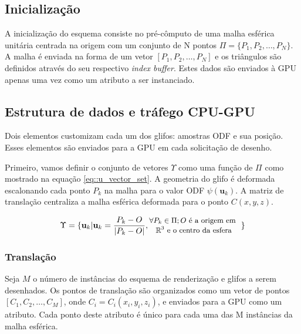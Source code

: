 \documentclass[
    12pt,                %
    oneside,            %
    a4paper,            %
    english,            %
    french,                %
    spanish,            %
    brazil                %
    ]{abntex2}
\begin{document}
\subsection{Inicialização}
\label{ssec::initializacao_glifo}

A inicialização do esquema consiste no pré-cômputo de uma malha esférica unitária centrada na origem com um conjunto de N pontos $\Pi = \{P_1, P_2, \dots, P_N\}$. A malha é enviada na forma de um vetor $[P_1, P_2, \dots, P_N]$ e os triângulos são definidos através do seu respectivo \textit{index buffer}. Estes dados são enviados à GPU apenas uma vez como um atributo a ser instanciado.

\subsection{Estrutura de dados e tráfego CPU-GPU}
\label{ssec::datastruct}

Dois elementos customizam cada um dos glifos: amostras ODF e sua posição. Esses elementos são enviados para a GPU em cada solicitação de desenho.

Primeiro, vamos definir o conjunto de vetores $\Upsilon$ como uma função de $\Pi$ como mostrado na equação \ref{eq::u_vector_set}. A geometria do glifo é deformada escalonando cada ponto $P_k$ na malha para o valor ODF $\psi(\mathbf{u}_k)$. A matriz de translação centraliza a malha esférica deformada para o ponto $C(x, y, z)$.

\begin{equation}
\label{eq::u_vector_set}
\Upsilon = \{\mathbf{u}_k | \mathbf{u}_k = \frac{P_k - O}{|P_k - O|}, 
\begin{tabular}{@{}c@{}}
\small{$\forall P_k \in \Pi; O$ é a origem em  } \\
\small{$\mathbb{R}^3$ e o centro da esfera}
\end{tabular}
\text{ }\}
\end{equation}





\subsubsection {Translação}
Seja $M$ o número de instâncias do esquema de renderização e glifos a serem desenhados. Os pontos de translação são organizados como um vetor de pontos $[C_1, C_2,\dots, C_M]$, onde $C_i = C_i(x_i, y_i, z_i)$, e enviados para a GPU como um atributo. Cada ponto deste atributo é único para cada uma das M instâncias da malha esférica.
\end{document}
